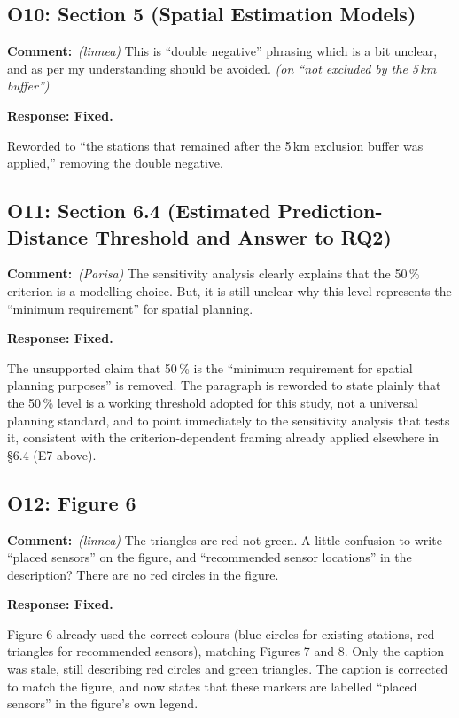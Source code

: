 \documentclass[11pt,a4paper]{article}
\newcommand{\rjcomment}[1]{\par\noindent\textbf{Comment:}\ #1\par}
\newcommand{\rjresponse}[1]{\par\noindent\textbf{Response: #1}\par}
\begin{document}
\subsection{O10: Section 5 (Spatial Estimation Models)}

\rjcomment{\emph{(linnea)} This is ``double negative'' phrasing which is a bit unclear, and as
per my understanding should be avoided. \emph{(on ``not excluded by the 5\,km buffer'')}}

\rjresponse{Fixed.}
Reworded to ``the stations that remained after the 5\,km exclusion buffer was applied,''
removing the double negative.

\subsection{O11: Section 6.4 (Estimated Prediction-Distance Threshold and Answer to RQ2)}

\rjcomment{\emph{(Parisa)} The sensitivity analysis clearly explains that the 50\,\% criterion is
a modelling choice. But, it is still unclear why this level represents the ``minimum
requirement'' for spatial planning.}

\rjresponse{Fixed.}
The unsupported claim that 50\,\% is the ``minimum requirement for spatial planning purposes''
is removed. The paragraph is reworded to state plainly that the 50\,\% level is a working
threshold adopted for this study, not a universal planning standard, and to point immediately to
the sensitivity analysis that tests it, consistent with the criterion-dependent framing already
applied elsewhere in \S6.4 (E7 above).

\subsection{O12: Figure 6}

\rjcomment{\emph{(linnea)} The triangles are red not green. A little confusion to write ``placed
sensors'' on the figure, and ``recommended sensor locations'' in the description? There are no
red circles in the figure.}

\rjresponse{Fixed.}
Figure 6 already used the correct colours (blue circles for existing stations, red triangles for
recommended sensors), matching Figures 7 and 8. Only the caption was stale, still describing red
circles and green triangles. The caption is corrected to match the figure, and now states that
these markers are labelled ``placed sensors'' in the figure's own legend.
\end{document}
